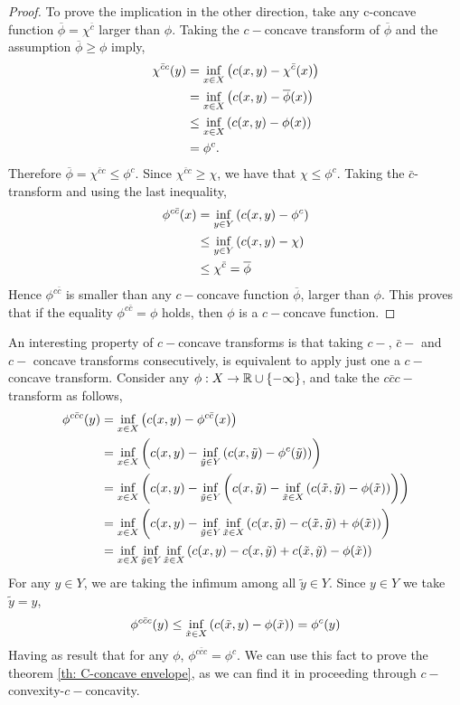 \begin{proof}
	To prove the implication in the other direction, take any c-concave function $\overline \phi =\chi^{\bar c}$ larger than $\phi$. Taking the $c-$concave transform of $\overline \phi$ and the assumption $\overline \phi \geq \phi$ imply,
	\begin{align*}
		\chi^{\bar c c}(y)&=\inf_{x\in X}\left( c(x,y)-\chi^{\bar c}(x) \right)\\
		&=\inf_{x\in X}\left( c(x,y)-\overline \phi(x) \right)\\
		&\leq \inf_{x\in X}\left( c(x,y)-\phi(x) \right)\\
		&=\phi^{c}.
	\end{align*}
	Therefore $\overline \phi =\chi^{\bar c c} \leq \phi^c$. Since $\chi^{\bar c c}\geq \chi$, we have that $\chi\leq \phi^c$. 
	Taking the $\bar c$-transform and using the last inequality,
	\begin{align*}
		\phi^{c\bar c}(x)&=\inf_{y\in Y} \left( c(x,y)-\phi^c \right)\\ 
		&\leq \inf_{y\in Y} \left( c(x,y)-\chi \right)\\
		&\leq \chi^{\bar c}=\overline \phi
	\end{align*}
	Hence $\phi^{c\bar  c}$ is smaller than any $c-$concave function $\overline \phi$, larger than $\phi$. This proves that if the equality $\phi^{c\bar c}=\phi$ holds, then $\phi$ is a $c-$concave function.  
\end{proof}

An interesting property of $c-$concave transforms is that taking $c-$, $\bar c -$ and $c-$ concave transforms consecutively, is equivalent to apply just one a $c-$concave transform. Consider any $\phi:X\rightarrow \mathbb{R}\cup\left\lbrace -\infty \right\rbrace$, and take the $c\bar c c-$transform as follows,
	\begin{align*}
	\phi^{c\bar cc}(y)&=\inf_{x\in X}\left( c(x,y)-\phi^{c\bar c }(x) \right) \\
	&=\inf_{x\in X}\left( c(x,y)-\inf_{\tilde y \in Y}\left( c(x, \tilde y)-\phi^{c}(\tilde y) \right) \right)\\
	&=\inf_{x\in X}\left( c(x,y)-\inf_{\tilde y \in Y}\left( c(x, \tilde y)-\inf_{\tilde x \in X}\left( c(\tilde x, \tilde y)-\phi(\tilde x) \right) \right) \right) \\
	&=\inf_{x\in X}\left( c(x,y)-\inf_{\tilde y \in Y}\inf_{\tilde x \in X}\left( c(x, \tilde y)-c(\tilde x, \tilde y)+\phi(\tilde x) \right) \right)\\
	&=\inf_{x\in X}\inf_{\tilde y \in Y}\inf_{\tilde x \in X}\left( c(x,y)-c(x, \tilde y)+c(\tilde x, \tilde y)-\phi(\tilde x) \right)
	\end{align*}
	For any $y\in Y$, we are taking the infimum among all $\tilde y \in Y$. Since $y\in Y$ we take $\tilde y = y$,  
	\begin{equation*}
	\phi^{c\bar cc}(y)\leq \inf_{\tilde x \in X}\left( c(\tilde x, y)-\phi(\tilde x) \right)=\phi^{c}(y)  
	\end{equation*} 
	Having as result that for any $\phi$, $\phi^{c\bar c c}=\phi^c$. We can use this fact to prove the theorem \ref{th: C-concave envelope}, as we can find it in \cite{Villani2008OT}
	proceeding through $c-$convexity-$c-$concavity. 

